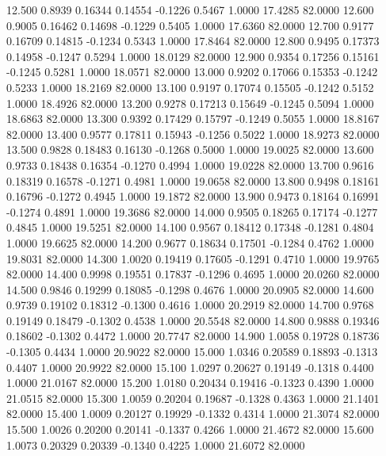   12.500   0.8939   0.16344   0.14554  -0.1226   0.5467   1.0000  17.4285  82.0000
  12.600   0.9005   0.16462   0.14698  -0.1229   0.5405   1.0000  17.6360  82.0000
  12.700   0.9177   0.16709   0.14815  -0.1234   0.5343   1.0000  17.8464  82.0000
  12.800   0.9495   0.17373   0.14958  -0.1247   0.5294   1.0000  18.0129  82.0000
  12.900   0.9354   0.17256   0.15161  -0.1245   0.5281   1.0000  18.0571  82.0000
  13.000   0.9202   0.17066   0.15353  -0.1242   0.5233   1.0000  18.2169  82.0000
  13.100   0.9197   0.17074   0.15505  -0.1242   0.5152   1.0000  18.4926  82.0000
  13.200   0.9278   0.17213   0.15649  -0.1245   0.5094   1.0000  18.6863  82.0000
  13.300   0.9392   0.17429   0.15797  -0.1249   0.5055   1.0000  18.8167  82.0000
  13.400   0.9577   0.17811   0.15943  -0.1256   0.5022   1.0000  18.9273  82.0000
  13.500   0.9828   0.18483   0.16130  -0.1268   0.5000   1.0000  19.0025  82.0000
  13.600   0.9733   0.18438   0.16354  -0.1270   0.4994   1.0000  19.0228  82.0000
  13.700   0.9616   0.18319   0.16578  -0.1271   0.4981   1.0000  19.0658  82.0000
  13.800   0.9498   0.18161   0.16796  -0.1272   0.4945   1.0000  19.1872  82.0000
  13.900   0.9473   0.18164   0.16991  -0.1274   0.4891   1.0000  19.3686  82.0000
  14.000   0.9505   0.18265   0.17174  -0.1277   0.4845   1.0000  19.5251  82.0000
  14.100   0.9567   0.18412   0.17348  -0.1281   0.4804   1.0000  19.6625  82.0000
  14.200   0.9677   0.18634   0.17501  -0.1284   0.4762   1.0000  19.8031  82.0000
  14.300   1.0020   0.19419   0.17605  -0.1291   0.4710   1.0000  19.9765  82.0000
  14.400   0.9998   0.19551   0.17837  -0.1296   0.4695   1.0000  20.0260  82.0000
  14.500   0.9846   0.19299   0.18085  -0.1298   0.4676   1.0000  20.0905  82.0000
  14.600   0.9739   0.19102   0.18312  -0.1300   0.4616   1.0000  20.2919  82.0000
  14.700   0.9768   0.19149   0.18479  -0.1302   0.4538   1.0000  20.5548  82.0000
  14.800   0.9888   0.19346   0.18602  -0.1302   0.4472   1.0000  20.7747  82.0000
  14.900   1.0058   0.19728   0.18736  -0.1305   0.4434   1.0000  20.9022  82.0000
  15.000   1.0346   0.20589   0.18893  -0.1313   0.4407   1.0000  20.9922  82.0000
  15.100   1.0297   0.20627   0.19149  -0.1318   0.4400   1.0000  21.0167  82.0000
  15.200   1.0180   0.20434   0.19416  -0.1323   0.4390   1.0000  21.0515  82.0000
  15.300   1.0059   0.20204   0.19687  -0.1328   0.4363   1.0000  21.1401  82.0000
  15.400   1.0009   0.20127   0.19929  -0.1332   0.4314   1.0000  21.3074  82.0000
  15.500   1.0026   0.20200   0.20141  -0.1337   0.4266   1.0000  21.4672  82.0000
  15.600   1.0073   0.20329   0.20339  -0.1340   0.4225   1.0000  21.6072  82.0000
